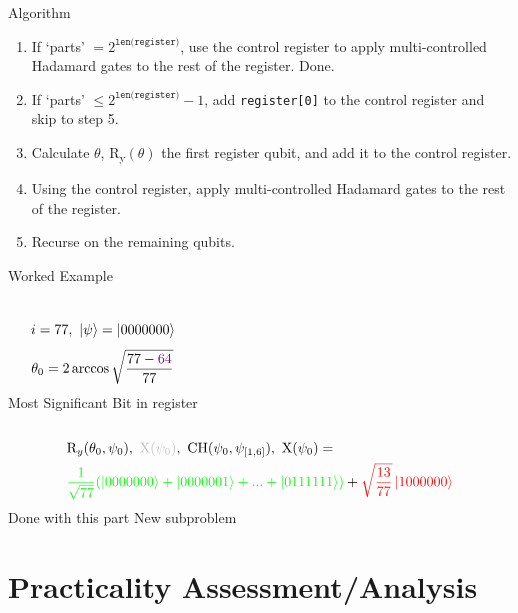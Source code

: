 \documentclass{beamer}
\begin{document}
  \begin{frame}{Algorithm}
  \begin{enumerate}
      \item If `parts' $= 2^\texttt{len(register)}$, use the control register to apply multi-controlled Hadamard gates to the rest of the register. Done.
      \item If `parts' $\leq 2^\texttt{len(register)}-1$, add \texttt{register[0]} to the control register and skip to step 5.
      \item Calculate $\theta$, R\textsubscript{y}$(\theta)$ the first register qubit, and add it to the control register.
      \item Using the control register, apply multi-controlled Hadamard gates to the rest of the register.
      \item Recurse on the remaining qubits. \\
  \end{enumerate}
  \end{frame}
  
  \begin{frame}{Worked Example}
    \begin{columns}
        $$i = 77, \ \ket{\psi} = \ket{0000000}$$
        $$\theta_0 = 2\arccos \sqrt{\frac{77-\color{violet}64}{77}}$$
        \color{violet} Most Significant Bit in register
    \end{columns}
    \begin{align*}
      &\text{R}_y(\theta_0, \psi_0), \ \color{lightgray}\text{X}(\psi_0)\color{black}, \ \text{CH}(\psi_0, \psi_{[1,6]}), \ \text{X}(\psi_0) = \\
      &\color{green} \frac{1}{\sqrt{77}} (\ket{0000000} + \ket{0000001} + ... + \ket{0111111}) \color{black} + \color{red} \sqrt{\frac{13}{77}} \ket{1000000}
      \end{align*}
      \hspace{60} \color{green} Done with this part \hspace{70} \color{red} New subproblem
  \end{frame}
  
  \section{Practicality Assessment/Analysis}
  
\end{document}
